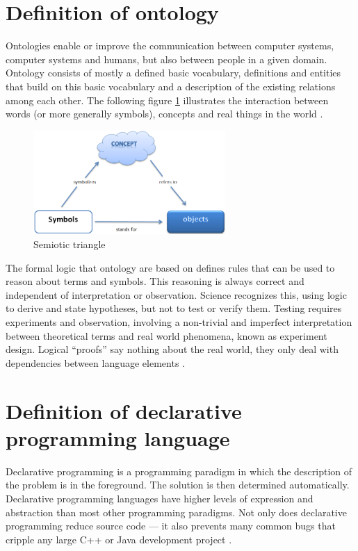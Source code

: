 \section{Definition of ontology}\label{sec:app:ontology}
\par
Ontologies enable or improve the communication between computer systems, computer systems and humans, but also between people in a given domain. Ontology consists of mostly a defined basic vocabulary, definitions and entities that build on this basic vocabulary and a description of the existing relations among each other. The following figure \ref{fig:semiotic_triangle} illustrates the interaction between words (or more generally symbols), concepts and real things in the world \autocite{appendix:ontology}.
\begin{figure}[h]
	\centering
	\includegraphics[width=0.65\textwidth]{pics/appendix/onto.png}
	\caption{Semiotic triangle \label{fig:semiotic_triangle}}	
\end{figure}
\par
The formal logic that ontology are based on defines rules that can be used to reason about terms and symbols. This reasoning is always correct and independent of interpretation or observation. Science recognizes this, using logic to derive and state hypotheses, but not to test or verify them. Testing requires experiments and observation, involving a non-trivial and imperfect interpretation between theoretical terms and real world phenomena, known as experiment design. Logical “proofs” say nothing about the real world, they only deal with dependencies between language elements \autocite{appendix:ontology}.

\section{Definition of declarative programming language}
\par
Declarative programming is a programming paradigm in which the description of the problem is in the foreground. The solution is then determined automatically. Declarative programming languages have higher levels of expression and abstraction than most other programming paradigms. Not only does declarative programming reduce source code — it also prevents many common bugs that cripple any large C++ or Java development project \autocite{appendix:hawkins}. 

